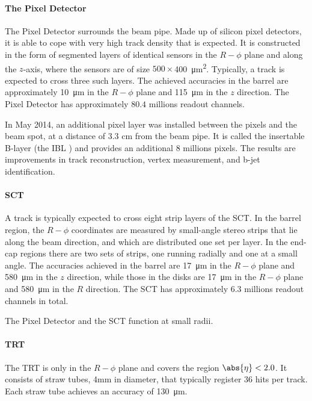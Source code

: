 \paragraph{The Pixel Detector} The Pixel Detector surrounds the beam pipe. Made
up of silicon pixel detectors, it is able to cope with very high track density
that is expected. It is constructed in the form of segmented layers of
identical sensors in the $R-\phi$ plane and along the $z$-axis, where the
sensors are of size $500\times$\SI{400}{\micro\meter^2}. Typically, a track is
expected to cross three such layers. The achieved accuracies in the barrel are
approximately \SI{10}{\micro\meter} in the $R-\phi$ plane and
\SI{115}{\micro\meter} in the $z$ direction. The Pixel Detector has
approximately $80.4$ millions readout channels.



In May 2014, an additional pixel layer was installed between the pixels and the
beam spot, at a distance of $3.3$ cm from the beam pipe. It is called the
insertable B-layer (the IBL \cite{atlasblayer}) and provides an additional $8$
millions pixels. The results are improvements in track reconstruction, vertex
measurement, and b-jet identification.

\paragraph{SCT} A track is typically expected to cross eight strip layers of
the SCT. In the barrel region, the $R-\phi$ coordinates are measured by
small-angle stereo strips that lie along the beam direction, and which are
distributed one set per layer. In the end-cap regions there are two sets of
strips, one running radially and one at a small angle. The accuracies achieved
in the barrel are \SI{17}{\micro\meter} in the $R-\phi$ plane and
\SI{580}{\micro\meter} in the $z$ direction, while those in the disks are
\SI{17}{\micro\meter} in the $R-\phi$ plane and \SI{580}{\micro\meter} in the
$R$ direction. The SCT has approximately $6.3$ millions readout channels in
total.

\vspace{2mm}

The Pixel Detector and the SCT function at small radii.

\vspace{5mm}

\paragraph{TRT} The TRT is only in the $R-\phi$ plane and covers the region
$\abs{\eta} < 2.0$. It consists of straw tubes, 4mm in diameter, that typically
register $36$ hits per track. Each straw tube achieves an accuracy of
\SI{130}{\micro\meter}.

